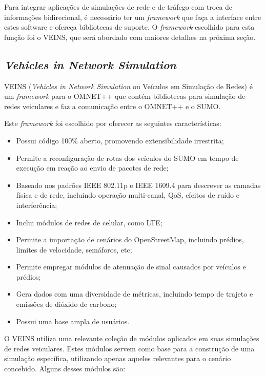 \documentclass[
12pt,				%
openright,			%
oneside,			%
a4paper,			%
brazil,				%
]{abntex2}
\begin{document}
	\par Para integrar aplicações de simulações de rede e de tráfego com troca de informações bidirecional, é necessário ter um \textit{framework} que faça a interface entre estes software e ofereça bibliotecas de suporte. O \textit{framework} escolhido para esta função foi o VEINS, que será abordado com maiores detalhes na próxima seção.
	
	\subsection{\textit{Vehicles in Network Simulation}}
	
	\par VEINS (\textit{Vehicles in Network Simulation} ou Veículos em Simulação de Redes) é um \textit{framework} para o OMNET++ que contém bibliotecas para simulação de redes veiculares e faz a comunicação entre o OMNET++ e o SUMO. 
	
	\par Este \textit{framework} foi escolhido por oferecer as seguintes características:
	
	\begin{itemize}
		\item Possui código 100\% aberto, promovendo extensibilidade irrestrita;
		\item Permite a reconfiguração de rotas dos veículos do SUMO em tempo de execução em reação ao envio de pacotes de rede;
		\item Baseado nos padrões IEEE 802.11p e IEEE 1609.4 para descrever as camadas física e de rede, incluindo operação multi-canal, QoS, efeitos de ruído e interferência;
		\item Inclui módulos de redes de celular, como LTE;
		\item Permite a importação de cenários do OpenStreetMap, incluindo prédios, limites de velocidade, semáforos, etc;
		\item Permite empregar módulos de atenuação de sinal causados por veículos e prédios;
		\item Gera dados com uma diversidade de métricas, incluindo tempo de trajeto e emissões de dióxido de carbono;
		\item Possui uma base ampla de usuários.
	\end{itemize}
	
	\par O VEINS utiliza uma relevante coleção de módulos aplicados em suas simulações de redes veiculares. Estes módulos servem como base para a construção de uma simulação específica, utilizando apenas aqueles relevantes para o cenário concebido. Alguns desses módulos são:
	
\end{document}
